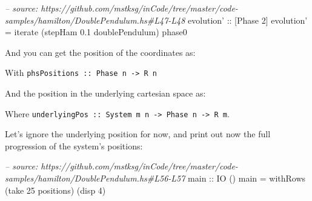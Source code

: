 \documentclass[]{article}
\newenvironment{Shaded}{}{}
\newcommand{\CommentTok}[1]{\textcolor[rgb]{0.38,0.63,0.69}{\textit{#1}}}
\newcommand{\DataTypeTok}[1]{\textcolor[rgb]{0.56,0.13,0.00}{#1}}
\newcommand{\DecValTok}[1]{\textcolor[rgb]{0.25,0.63,0.44}{#1}}
\newcommand{\FloatTok}[1]{\textcolor[rgb]{0.25,0.63,0.44}{#1}}
\newcommand{\FunctionTok}[1]{\textcolor[rgb]{0.02,0.16,0.49}{#1}}
\newcommand{\NormalTok}[1]{#1}
\newcommand{\OtherTok}[1]{\textcolor[rgb]{0.00,0.44,0.13}{#1}}
\begin{document}
\begin{Shaded}
\begin{Highlighting}[]
\CommentTok{-- source: https://github.com/mstksg/inCode/tree/master/code-samples/hamilton/DoublePendulum.hs#L47-L48}
\OtherTok{evolution' ::}\NormalTok{ [}\DataTypeTok{Phase} \DecValTok{2}\NormalTok{]}
\NormalTok{evolution' }\FunctionTok{=}\NormalTok{ iterate (stepHam }\FloatTok{0.1}\NormalTok{ doublePendulum) phase0}
\end{Highlighting}
\end{Shaded}

And you can get the position of the coordinates as:

\begin{Shaded}
\end{Shaded}

With \texttt{phsPositions\ ::\ Phase\ n\ -\textgreater{}\ R\ n}

And the position in the underlying cartesian space as:

\begin{Shaded}
\end{Shaded}

Where
\texttt{underlyingPos\ ::\ System\ m\ n\ -\textgreater{}\ Phase\ n\ -\textgreater{}\ R\ m}.

Let's ignore the underlying position for now, and print out now the full
progression of the system's positions:

\begin{Shaded}
\begin{Highlighting}[]
\CommentTok{-- source: https://github.com/mstksg/inCode/tree/master/code-samples/hamilton/DoublePendulum.hs#L56-L57}
\OtherTok{main ::} \DataTypeTok{IO}\NormalTok{ ()}
\NormalTok{main }\FunctionTok{=}\NormalTok{ withRows (take }\DecValTok{25}\NormalTok{ positions) (disp }\DecValTok{4}\NormalTok{)}
\end{Highlighting}
\end{Shaded}
\end{document}
